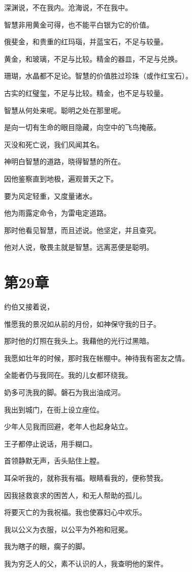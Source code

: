 \documentclass[12pt,oneside]{book}
\begin{document}
深渊说，不在我内。沧海说，不在我中。

智慧非用黄金可得，也不能平白银为它的价值。

俄斐金，和贵重的红玛瑙，并蓝宝石，不足与较量。

黄金，和玻璃，不足与比较。精金的器皿，不足与兑换。

珊瑚，水晶都不足论。智慧的价值胜过珍珠（或作红宝石）。

古实的红璧玺，不足与比较。精金，也不足与较量。

智慧从何处来呢。聪明之处在那里呢。

是向一切有生命的眼目隐藏，向空中的飞鸟掩蔽。

灭没和死亡说，我们风闻其名。

神明白智慧的道路，晓得智慧的所在。

因他鉴察直到地极，遍观普天之下。

要为风定轻重，又度量诸水。

他为雨露定命令，为雷电定道路。

那时他看见智慧，而且述说。他坚定，并且查究。

他对人说，敬畏主就是智慧。远离恶便是聪明。


\chapter{第29章}
约伯又接着说，

惟愿我的景况如从前的月份，如神保守我的日子。

那时他的灯照在我头上。我藉他的光行过黑暗。

我愿如壮年的时候，那时我在帐棚中。神待我有密友之情。

全能者仍与我同在。我的儿女都环绕我。

奶多可洗我的脚。磐石为我出油成河。

我出到城门，在街上设立座位。

少年人见我而回避，老年人也起身站立。

王子都停止说话，用手糊口。

首领静默无声，舌头贴住上膛。

耳朵听我的，就称我有福。眼睛看我的，便称赞我。

因我拯救哀求的困苦人，和无人帮助的孤儿。

将要灭亡的为我祝福。我也使寡妇心中欢乐。

我以公义为衣服，以公平为外袍和冠冕。

我为瞎子的眼，瘸子的脚。

我为穷乏人的父，素不认识的人，我查明他的案件。
\end{document}
